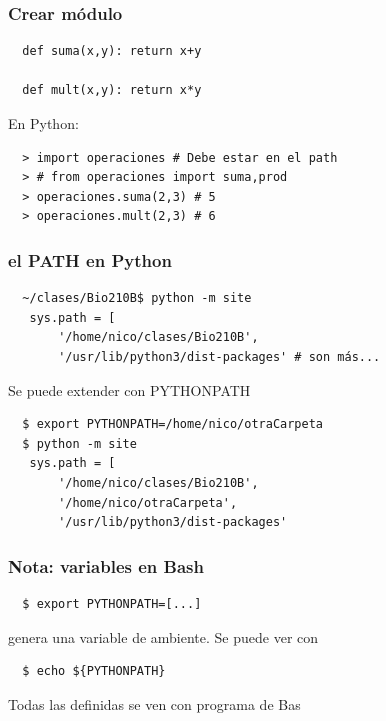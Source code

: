 \documentclass[14pt,aspectratio=169,xcolor=dvipsnames]{beamer}
\begin{document}
\begin{frame}[fragile]\frametitle{Crear módulo}
    \begin{verbatim}
  def suma(x,y): return x+y

  def mult(x,y): return x*y
    \end{verbatim}

  En Python:
  \begin{verbatim}
  > import operaciones # Debe estar en el path
  > # from operaciones import suma,prod
  > operaciones.suma(2,3) # 5
  > operaciones.mult(2,3) # 6
  \end{verbatim}
\end{frame}
\begin{frame}[fragile]\frametitle{el PATH en Python}
    \begin{verbatim}
  ~/clases/Bio210B$ python -m site
   sys.path = [
       '/home/nico/clases/Bio210B',
       '/usr/lib/python3/dist-packages' # son más...
    \end{verbatim}

    \pause Se puede extender con PYTHONPATH
    \begin{verbatim}
  $ export PYTHONPATH=/home/nico/otraCarpeta
  $ python -m site
   sys.path = [
       '/home/nico/clases/Bio210B',
       '/home/nico/otraCarpeta',
       '/usr/lib/python3/dist-packages'
    \end{verbatim}

\end{frame}
\begin{frame}[fragile]\frametitle{Nota: variables en Bash}
    \begin{verbatim}
  $ export PYTHONPATH=[...]
    \end{verbatim}
    genera una variable de ambiente. Se puede ver con
    \begin{verbatim}
  $ echo ${PYTHONPATH}
    \end{verbatim}
  Todas las definidas se ven con programa  de Bas

\end{frame}
\end{document}
